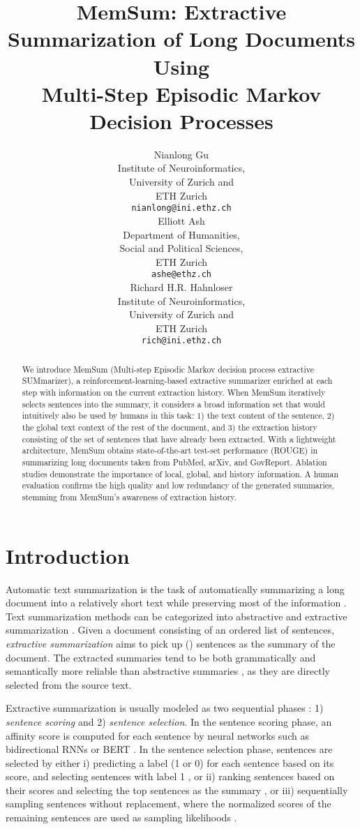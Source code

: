 \documentclass[11pt]{article}
\title{MemSum: Extractive Summarization of Long Documents Using \\ Multi-Step Episodic Markov Decision Processes}
\author{Nianlong Gu \\
  Institute of Neuroinformatics,\\ 
  University of Zurich and\\
  ETH Zurich\\
  \texttt{nianlong@ini.ethz.ch} \\\And
  Elliott Ash \\
  Department of Humanities,\\
  Social and Political Sciences, \\
  ETH Zurich \\
  \texttt{ashe@ethz.ch} \\ \And
  Richard H.R. Hahnloser\\
  Institute of Neuroinformatics,\\
  University of Zurich and\\
  ETH Zurich\\
  \texttt{rich@ini.ethz.ch}\\
  }
\begin{document}
\maketitle
\begin{abstract}
We introduce MemSum (Multi-step Episodic Markov decision process extractive SUMmarizer), a reinforcement-learning-based extractive summarizer enriched at each step with information on the current extraction history. When MemSum iteratively selects sentences into the summary, it considers a broad information set that would intuitively also be used by humans in this task: 1) the text content of the sentence, 2) the global text context of the rest of the document, and 3) the extraction history consisting of the set of sentences that have already been extracted. With a lightweight architecture, MemSum obtains state-of-the-art test-set performance (ROUGE) in summarizing long documents taken from PubMed, arXiv, and GovReport. Ablation studies demonstrate the importance of local, global, and history information. A human evaluation confirms the high quality and low redundancy of the generated summaries, stemming from MemSum's awareness of extraction history.
\end{abstract}

\section{Introduction}

Automatic text summarization is the task of automatically summarizing a long document into a relatively short text while preserving most of the information \cite{tas2007survey}. Text summarization methods can be categorized into abstractive and extractive summarization \cite{10.1007/s10462-016-9475-9,nenkova_survey_2012}. Given a document  consisting of an ordered list of  sentences, \textit{extractive summarization} aims to pick up  () sentences as the summary of the document. The extracted summaries tend to be both grammatically and semantically more reliable than abstractive summaries \cite{liu2018generating, liu2019hierarchical, luo2019reading,liao2020improving}, as they are directly selected from the source text.

Extractive summarization is usually modeled as two sequential phases \cite{zhou-etal-2018-neural-document}: 1) \textit{sentence scoring} and 2) \textit{sentence selection}. In the sentence scoring phase, an affinity score is computed for each sentence by neural networks such as bidirectional RNNs \cite{dong2018banditsum,narayan2018ranking,luo2019reading,xiao-carenini-2019-extractive} or BERT \cite{zhang2019hibert,liu2019text}. In the sentence selection phase, sentences are selected by either i) predicting a label (1 or 0) for each sentence based on its score, and selecting sentences with label 1 \cite{zhang2019hibert,liu2019text,xiao-carenini-2019-extractive}, or ii) ranking sentences based on their scores and selecting the top  sentences as the summary \cite{narayan2018ranking}, or iii) sequentially sampling sentences without replacement, where the normalized scores of the remaining sentences are used as sampling likelihoods \cite{dong2018banditsum,luo2019reading}.
\end{document}
